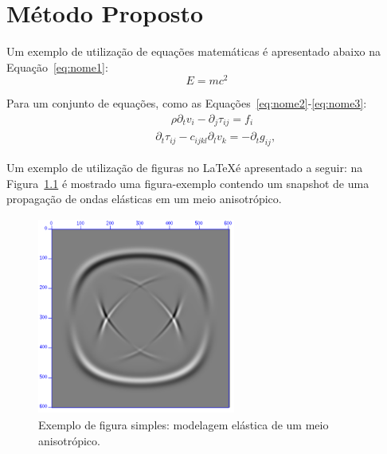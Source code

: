 \chapter{Método Proposto}

Um exemplo de utilização de equações matemáticas é apresentado abaixo na Equação~\ref{eq:nome1}:
\begin{equation}
\label{eq:nome1}E=mc^2
\end{equation}

Para um conjunto de equações, como as Equações~\ref{eq:nome2}-\ref{eq:nome3}:
\begin{eqnarray}
\label{eq:nome2} & & \;\;\;\;\; \rho \partial_t v_i
 - \partial_j \tau_{ij} = f_i\\
\label{eq:nome3} & &
\partial_t \tau_{ij}-c_{ijkl}\partial_l v_{k}=-\partial_tg_{ij},
\end{eqnarray}


Um exemplo de utilização de figuras no \LaTeX é apresentado a seguir: na
Figura~\ref{fig:caption1} é mostrado uma figura-exemplo contendo um snapshot
de uma propagação de ondas elásticas em um meio anisotrópico.
\begin{figure}[hbt]
\centering \includegraphics[width=6.5cm,height=6.5cm]{Figs/snap}
\caption[Exemplo de figura simples (texto do índice).]{Exemplo de figura simples:
modelagem elástica de um meio anisotrópico.}
\label{fig:caption1}
\end{figure}


